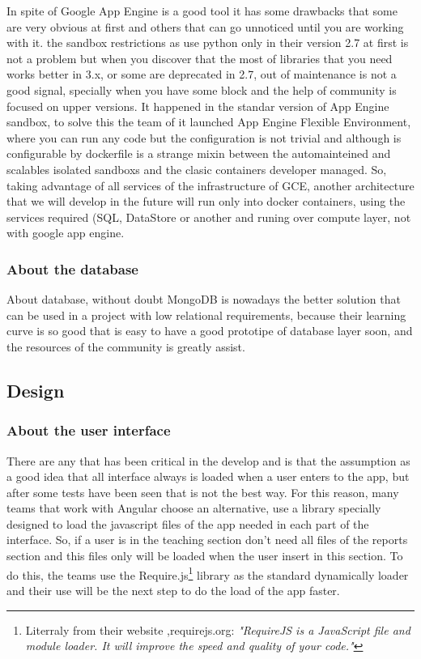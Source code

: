 In spite of Google App Engine is a good tool it has some drawbacks that some are
very obvious at first and others that can go unnoticed until you are working with it.
the sandbox restrictions as use python only in their version 2.7 at first is not
a problem but when you discover that the most of libraries that you need works
better in 3.x, or some are deprecated in 2.7, out of maintenance is not a good
signal, specially when you have some block and the help of community is focused
on upper versions. It happened in the standar version of App Engine sandbox, to
solve this the team of it launched App Engine Flexible Environment, where you can
run any code but the configuration is not trivial and although is configurable by
dockerfile is a strange mixin between the automainteined and scalables isolated
sandboxs and the clasic containers developer managed.
\linebreak
\linebreak
\noindent So, taking advantage of all services of the infrastructure of GCE, another
architecture that we will develop in the future will run only into docker containers,
using the services required (SQL, DataStore or another and runing over compute layer,
not with google app engine.

\subsubsection{About the database}

About database, without doubt MongoDB is nowadays the better solution that
can be used in a project with low relational requirements, because their learning
curve is so good that is easy to have a good prototipe of database layer soon,
and the resources of the community is greatly assist.

\subsection {Design}

\subsubsection{About the user interface}

There are any that has been critical in the develop and is that the assumption
as a good idea that all interface always is loaded when a user enters to the app,
but after some tests have been seen that is not the best way.  For this reason,
many teams that work with Angular choose an alternative, use a library specially
designed to load the javascript files of the app needed in each part of the interface.
So, if a user is in the teaching section don't need all files of the reports section
and this files only will be loaded when the user insert in this section. To do this,
the teams use the Require.js\footnote{Literraly from their website ,requirejs.org: \textit{"RequireJS is a
JavaScript file and module loader. It will improve the speed and quality of your code."}} library as
the standard dynamically loader and their use will be the next step to do the
load of the app faster.

